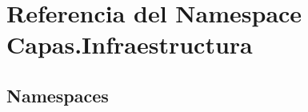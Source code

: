 \section{Referencia del Namespace Capas.\+Infraestructura}
\label{namespace_capas_1_1_infraestructura}
\subsection*{Namespaces}
\begin{DoxyCompactItemize}
\end{DoxyCompactItemize}
